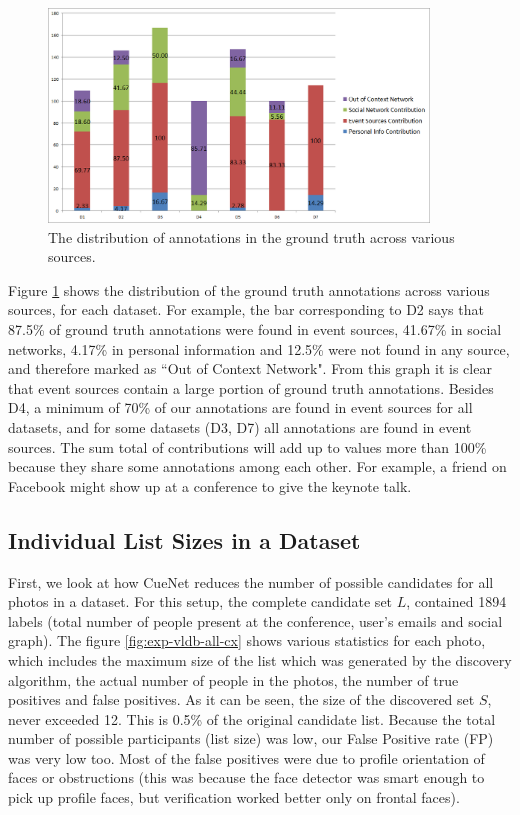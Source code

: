 \begin{figure}[t]
\centering
\includegraphics[width=0.9\textwidth]{media/gt-distro-stacked-2.png}
\caption{The distribution of annotations in the ground truth across various sources.}
\label{fig:src-cand-distribution}
\end{figure}

Figure \ref{fig:src-cand-distribution} shows the distribution of the ground truth annotations across various sources, for each dataset. For example, the bar corresponding to D2 says that 87.5\% of ground truth annotations were found in event sources, 41.67\% in social networks, 4.17\% in personal information and 12.5\% were not found in any source, and therefore marked as ``Out of Context Network". From this graph it is clear that event sources contain a large portion of ground truth annotations. Besides D4, a minimum of 70\% of our annotations are found in event sources for all datasets, and for some datasets (D3, D7) all annotations are found in event sources. The sum total of contributions will add up to values more than 100\% because they share some annotations among each other. For example, a friend on Facebook might show up at a conference to give the keynote talk.

\subsection{Individual List Sizes in a Dataset}
First, we look at how CueNet reduces the number of possible candidates for all photos in a dataset. For this setup, the complete candidate set $L$, contained 1894 labels (total number of people present at the conference, user's emails and social graph). The figure \ref{fig:exp-vldb-all-cx} shows various statistics for each photo, which includes the maximum size of the list which was generated by the discovery algorithm, the actual number of people in the photos, the number of true positives and false positives. As it can be seen, the size of the discovered set $S$, never exceeded 12. This is 0.5\% of the original candidate list. Because the total number of possible participants (list size) was low, our False Positive rate (FP) was very low too. Most of the false positives were due to profile orientation of faces or obstructions (this was because the face detector was smart enough to pick up profile faces, but verification worked better only on frontal faces).

